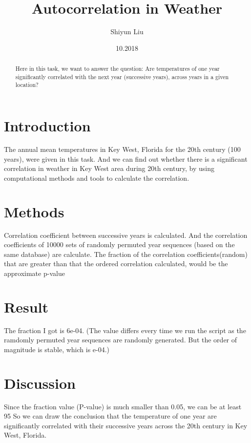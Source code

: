 \documentclass[12pt]{article}
\title{Autocorrelation in Weather}
\author{Shiyun Liu}}
\date{10.2018}
\begin{document}
  \maketitle
  \begin{abstract}
    Here in this task, we want to answer the question:
    Are temperatures of one year significantly correlated with the next year (successive years), across years in a given location?
  \end{abstract}
  \section{Introduction}
    The annual mean temperatures in Key West, Florida for the 20th century (100 years), were given in this task.
    And we can find out whether there is a significant correlation in weather in Key West area during 20th century, by using computational methods and tools to calculate the correlation.
  \section{Methods}
    Correlation coefficient between successive years is calculated.
    And the correlation coefficients of 10000 sets of randomly permuted year sequences (based on the same database) are calculate.
    The fraction of the correlation coefficients(random) that are greater than that the ordered correlation calculated, would be the approximate p-value
  \section{Result}
    The fraction I got is 6e-04. 
    (The value differs every time we run the script as the ramdomly permuted year sequences are randomly generated.
     But the order of magnitude is stable, which is e-04.)
  \section{Discussion}
    Since the fraction value (P-value) is much smaller than 0.05, we can be at least 95%
    So we can draw the conclusion that the temperature of one year are significantly correlated with their successive years across the 20th century in Key West, Florida.
  
  
\end{document}
